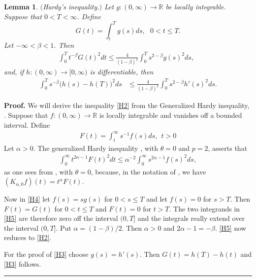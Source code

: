 \documentclass[12pt]{article}
\newtheorem{lemma}[theorem]{Lemma}
\newenvironment{proof}[1][Proof]{\textbf{#1.} }{\ \rule{0.5em}{0.5em}}
\def \({\Big(}
\def \){\Big)}
\def \R{\mathbb R}
\def \beq{\begin{equation}}
\def \eeq{\end{equation}}
\def \eref{\eqref}
\numberwithin{equation}{section}
\begin{document}
\begin{lemma}\label{HI} $($Hardy's inequality.$)$
Let $g:(0, \infty)\rightarrow \R$ be locally integrable. 
 Suppose that $0 < T <\infty$. Define
\beq
G(t) = \int_t^T g(s)ds, \ \ \ 0<t \le T.   \label{H0}
\eeq
Let     $- \infty < \beta < 1$. Then
\begin{align} 
\int_0^T t^{-\beta} G(t)^2 dt \le \frac{4}{(1-\beta)^2} \int_0^T s^{2 -\beta} g(s)^2 ds,\ \  \label{H2}
\end{align}
and, if  
$h:(0, \infty) \rightarrow [ 0, \infty)$ is differentiable,
then
\begin{align}
\int_0^T s^{-\beta} \(h(s) - h(T)\)^2 ds
    &\le \frac{4}{(1- \beta)^2} \int_0^T s^{2-\beta} h'(s)^2 ds.      
    \label{H3}  
\end{align}   

\end{lemma}
         \begin{proof}  We will derive the inequality  \eref{H2} 
from   the Generalized Hardy inequality, \cite[Equ. (6.1.31)]{SiPt3}. 
  Suppose that $f:(0, \infty) \rightarrow \R$ is locally integrable and vanishes off a bounded interval.
Define
\begin{align}
F(t) = \int_t^\infty s^{-1}f(s) ds, \ \ t >0     \label{H4}
\end{align}   
Let $\alpha >0$. 
The generalized Hardy inequality    \cite[Equ. (6.1.31)]{SiPt3},  with $\theta =0$ and $p =2$,
 asserts that
\begin{align}
         \int_0^\infty t^{2\alpha - 1} F(t)^2 dt \le \alpha^{-2} \int_0^\infty s^{2\alpha -1} f(s)^2 ds,    \label{H5}
         \end{align}
         as one sees from   \cite[Equ. (6.1.29)]{SiPt3}, with $\theta =0$,  because, in the notation of 
         \cite{SiPt3},      we have   $(K_{\alpha, 0}f)(t) = t^\alpha F(t)$.

Now in \eref{H4} let $f(s) = s g(s)$ for $0<s \le T$ and let $f(s) =0$ for $s >T$. 
Then $F(t) = G(t)$ for $0 < t \le T$  and $F(t)=0 $ for $t >T$.
The two integrands in \eref{H5} are therefore zero off the interval $(0,T]$ and  the integrals
 really extend over the interval $(0, T]$.
Put $\alpha = (1-\beta)/2$. Then $\alpha > 0$ and $2\alpha -1 = -\beta$.
 \eref{H5}  now reduces to \eref{H2}.
 
 For the proof of \eref{H3} choose $g(s)= h'(s)$. Then $G(t) = h(T) - h(t)$ and \eref{H3} follows.
   \end{proof}
\end{document}
